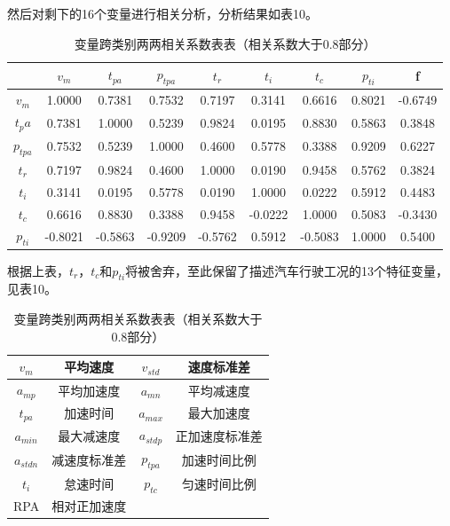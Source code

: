 \documentclass[bwprint]{gmcmthesis}
\begin{document}
然后对剩下的16个变量进行相关分析，分析结果如表10。
\begin{table}[htbp]
\caption{变量跨类别两两相关系数表表（相关系数大于0.8部分）}
\centering
\begin{tabular}{c c c c c c c c c}%
\hline  %
	& $v_m$ & $t_{pa}$	&$p_{tpa}$ &$t_r$ &$t_i$ &$t_c$ &$p_{ti}$&	f\\
\hline
$v_m$	&1.0000	&0.7381&	0.7532&0.7197&0.3141	&0.6616&	0.8021	&-0.6749\\
$t_pa$	&0.7381	&1.0000&0.5239&0.9824	&0.0195	&0.8830	&0.5863&	0.3848\\
$p_{tpa}$&	0.7532&0.5239	&1.0000	&0.4600	&0.5778&	0.3388	&0.9209	&0.6227\\
$t_r$	&0.7197&	0.9824	&0.4600&	1.0000	&0.0190	&0.9458	&0.5762&	0.3824\\
$t_i$	&0.3141&0.0195	&0.5778&0.0190	&1.0000	&0.0222	&0.5912	&0.4483\\
$t_c$	&0.6616&0.8830	&0.3388&0.9458	&-0.0222	&1.0000	&0.5083	&-0.3430\\
$p_{ti}$	&-0.8021&-0.5863&-0.9209&-0.5762&0.5912&-0.5083	&1.0000	&0.5400\\

\hline  %
\end{tabular}
\end{table}
根据上表，$t_r$，$t_c$和$p_{ti}$将被舍弃，至此保留了描述汽车行驶工况的13个特征变量，见表10。
\begin{table}[htbp]
\caption{变量跨类别两两相关系数表表（相关系数大于0.8部分）}
\centering
\begin{tabular}{c c c c}%
\hline  %
$v_m$	&平均速度	&$v_{std}$	&速度标准差\\
\hline
$a_{mp}$	&平均加速度&	$a_{mn}$	&平均减速度\\
$t_{pa}$	&加速时间	&$a_{max}$	&最大加速度\\
$a_{min}$	&最大减速度	&$a_{stdp}$	&正加速度标准差\\
$a_{stdn}$	&减速度标准差&	$p_{tpa}$&加速时间比例\\
$t_i$	&怠速时间	&$p_{tc}$	&匀速时间比例\\
RPA	&相对正加速度&	&\\
\hline  %
\end{tabular}
\end{table}
\end{document}

